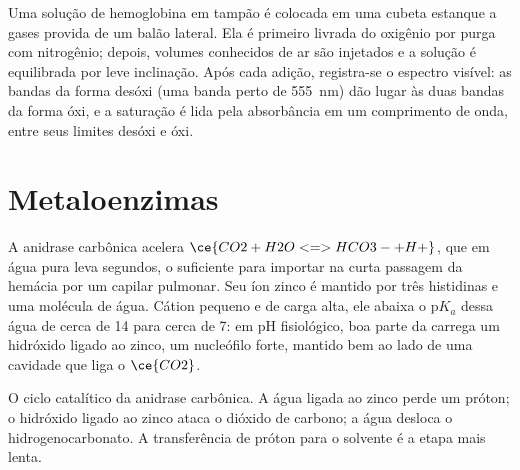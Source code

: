 \begin{inthelab}
Uma solução de hemoglobina em tampão é colocada em uma cubeta estanque a gases provida
de um balão lateral. Ela é primeiro livrada do oxigênio por purga com nitrogênio; depois,
volumes conhecidos de ar são injetados e a solução é equilibrada por leve
inclinação. Após cada adição, registra-se o espectro visível: as bandas da
forma desóxi (uma banda perto de \qty{555}{nm}) dão lugar às duas bandas da forma óxi,
e a saturação é lida pela absorbância em um comprimento de onda, entre seus limites
desóxi e óxi.
\end{inthelab}

\section{Metaloenzimas}

A anidrase carbônica acelera $\ce{CO2 + H2O <=> HCO3- + H+}$, que em água pura leva
segundos, o suficiente para importar na curta passagem da hemácia por um capilar
pulmonar. Seu íon zinco é mantido por três histidinas e uma molécula de água. Cátion
pequeno e de carga alta, ele abaixa o $\mathrm pK_a$ dessa água de cerca de 14 para
cerca de 7: em pH fisiológico, boa parte da  carrega um hidróxido ligado ao zinco,
um nucleófilo forte, mantido bem ao lado de uma cavidade que liga o $\ce{CO2}$.

\begin{omfigure}

{\small O ciclo catalítico da anidrase carbônica. A água ligada ao zinco perde um
próton; o hidróxido ligado ao zinco ataca o dióxido de carbono; a água desloca o
hidrogenocarbonato. A transferência de próton para o solvente é a etapa mais lenta.}
\end{omfigure}

